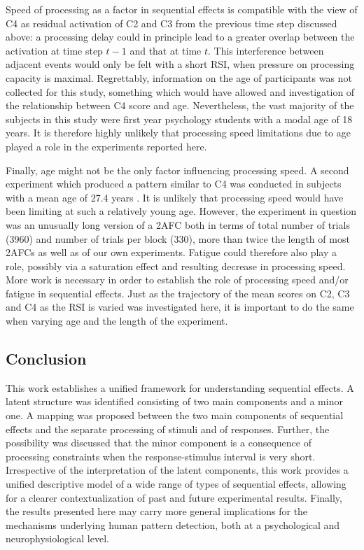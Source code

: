 \documentclass{apa}[12pt]
\begin{document}
Speed of processing as a factor in sequential effects is compatible with the view of C4 as residual activation of C2 and C3 from the previous time step discussed above: a processing delay could in principle lead to a greater overlap between the activation at time step $t-1$ and that at time $t$. This interference between adjacent events would only be felt with a short RSI, when pressure on processing capacity is maximal. Regrettably, information on the age of participants was not collected for this study, something which would have allowed and investigation of the relationship between C4 score and age. Nevertheless, the vast majority of the subjects in this study were first year psychology students with a modal age of 18 years. It is therefore highly unlikely that processing speed limitations due to age played a role in the experiments reported here.

Finally, age might not be the only factor influencing processing speed. A second experiment which produced a pattern similar to C4 was conducted in subjects with a mean age of 27.4 years \cite{Jentzsch02}. It is unlikely that processing speed would have been limiting at such a relatively young age. However, the experiment in question was an unusually long version of a 2AFC both in terms of total number of trials (3960) and number of trials per block (330), more than twice the length of most 2AFCs \cite{Soetens85,Cho02,Jones02} as well as of our own experiments. Fatigue could therefore also play a role, possibly via a saturation effect and resulting decrease in processing speed. More work is necessary in order to establish the role of processing speed and/or fatigue in sequential effects. Just as the trajectory of the mean scores on C2, C3 and C4 as the RSI is varied was investigated here, it is important to do the same when varying age and the length of the experiment.

\subsection{Conclusion}

This work establishes a unified framework for understanding sequential effects. A latent structure was identified consisting of two main components and a minor one. A mapping was proposed between the two main components of sequential effects and the separate processing of stimuli and of responses. Further, the possibility was discussed that the minor component is a consequence of processing constraints when the response-stimulus interval is very short. Irrespective of the interpretation of the latent components, this work provides a unified descriptive model of a wide range of types of sequential effects, allowing for a clearer contextualization of past and future experimental results. Finally, the results presented here may carry more general implications for the mechanisms underlying human pattern detection, both at a psychological and neurophysiological level.
\end{document}
